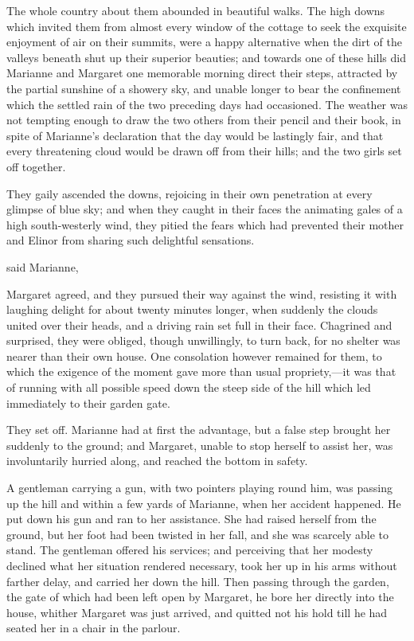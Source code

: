 The whole country about them abounded in beautiful walks. The high downs which invited them from almost every window of the cottage to seek the exquisite enjoyment of air on their summits, were a happy alternative when the dirt of the valleys beneath shut up their superior beauties; and towards one of these hills did Marianne and Margaret one memorable morning direct their steps, attracted by the partial sunshine of a showery sky, and unable longer to bear the confinement which the settled rain of the two preceding days had occasioned. The weather was not tempting enough to draw the two others from their pencil and their book, in spite of Marianne's declaration that the day would be lastingly fair, and that every threatening cloud would be drawn off from their hills; and the two girls set off together.

They gaily ascended the downs, rejoicing in their own penetration at every glimpse of blue sky; and when they caught in their faces the animating gales of a high south-westerly wind, they pitied the fears which had prevented their mother and Elinor from sharing such delightful sensations.

 said Marianne, 

Margaret agreed, and they pursued their way against the wind, resisting it with laughing delight for about twenty minutes longer, when suddenly the clouds united over their heads, and a driving rain set full in their face. Chagrined and surprised, they were obliged, though unwillingly, to turn back, for no shelter was nearer than their own house. One consolation however remained for them, to which the exigence of the moment gave more than usual propriety,---it was that of running with all possible speed down the steep side of the hill which led immediately to their garden gate.

They set off. Marianne had at first the advantage, but a false step brought her suddenly to the ground; and Margaret, unable to stop herself to assist her, was involuntarily hurried along, and reached the bottom in safety.

A gentleman carrying a gun, with two pointers playing round him, was passing up the hill and within a few yards of Marianne, when her accident happened. He put down his gun and ran to her assistance. She had raised herself from the ground, but her foot had been twisted in her fall, and she was scarcely able to stand. The gentleman offered his services; and perceiving that her modesty declined what her situation rendered necessary, took her up in his arms without farther delay, and carried her down the hill. Then passing through the garden, the gate of which had been left open by Margaret, he bore her directly into the house, whither Margaret was just arrived, and quitted not his hold till he had seated her in a chair in the parlour.

